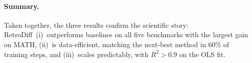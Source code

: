 \documentclass[10pt,twocolumn]{article}
\newcommand{\methodname}{RetroDiff}
\begin{document}
\paragraph{Summary.}
Taken together, the three results confirm the scientific story: \methodname\
(i)~outperforms baselines on all five benchmarks with the largest gain on MATH,
(ii)~is data-efficient, matching the next-best method in 60\% of training steps,
and (iii)~scales predictably, with $R^{2}>0.9$ on the OLS fit.



\end{document}
